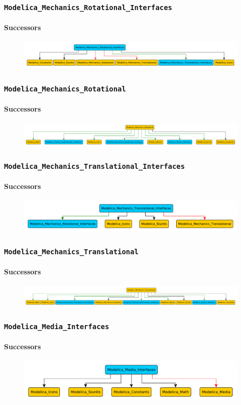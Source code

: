 \documentclass[aspectratio=1610]{beamer}
\begin{document}
\begin{frame}
  \frametitle{\texttt{Modelica\_Mechanics\_Rotational\_Interfaces}}
  \framesubtitle{Successors}
  \begin{figure}
      \includegraphics[width=\textwidth]{Modelica_Mechanics_Rotational_Interfaces}
  \end{figure}
\end{frame}

\begin{frame}
  \frametitle{\texttt{Modelica\_Mechanics\_Rotational}}
  \framesubtitle{Successors}
  \begin{figure}
      \includegraphics[width=\textwidth]{Modelica_Mechanics_Rotational}
  \end{figure}
\end{frame}

\begin{frame}
  \frametitle{\texttt{Modelica\_Mechanics\_Translational\_Interfaces}}
  \framesubtitle{Successors}
  \begin{figure}
      \includegraphics[width=\textwidth]{Modelica_Mechanics_Translational_Interfaces}
  \end{figure}
\end{frame}

\begin{frame}
  \frametitle{\texttt{Modelica\_Mechanics\_Translational}}
  \framesubtitle{Successors}
  \begin{figure}
      \includegraphics[width=\textwidth]{Modelica_Mechanics_Translational}
  \end{figure}
\end{frame}

\begin{frame}
  \frametitle{\texttt{Modelica\_Media\_Interfaces}}
  \framesubtitle{Successors}
  \begin{figure}
      \includegraphics[width=\textwidth]{Modelica_Media_Interfaces}
  \end{figure}
\end{frame}
\end{document}
